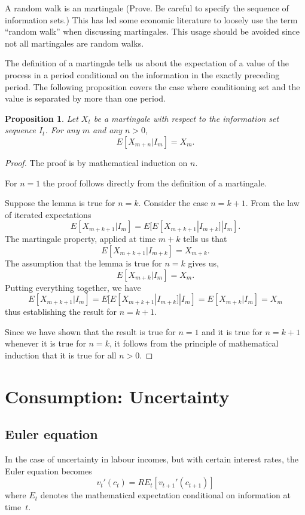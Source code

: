 \documentclass[12pt,reqno,openany]{amsbook}
\theoremstyle{plain}
\newtheorem{prop}{Proposition}[chapter]
\theoremstyle{definition}
\begin{document}
A random walk is an martingale (Prove. Be careful to specify the
sequence of information sets.) This has led some economic literature
to loosely use the term ``random walk'' when discussing martingales.
This usage should be avoided since not all martingales are random walks.

The definition of a martingale tells us about the expectation of a
value of the process in a period conditional on the information in the
exactly preceding period. The following proposition covers the case where
conditioning set and the value is separated by more than one period.

\begin{prop}\label{prop:martingale-mp}
Let $X_t$ be a martingale with respect to the information set sequence
$I_t$. For any $m$ and any $n>0$,
\[E[X_{m+n}|I_m]=X_m.\]
\end{prop}
\begin{proof}
The proof is by mathematical induction on $n$.

For $n=1$ the proof follows directly from the definition of a martingale.

Suppose the lemma is true for $n=k$. Consider the case $n=k+1$.
From the law of
iterated expectations
\[E[X_{m+k+1}|I_m]=E[E[X_{m+k+1}|I_{m+k}]|I_m].\]
The martingale property, applied at time $m+k$ tells us that
\[E[X_{m+k+1}|I_{m+k}]=X_{m+k}.\] 
The assumption that the lemma is true for $n=k$ gives us,
\[E[X_{m+k}|I_m]=X_m.\]
Putting everything together, we have
\[E[X_{m+k+1}|I_m]=E[E[X_{m+k+1}|I_{m+k}]|I_m]=E[X_{m+k}|I_m]=X_m\]
thus establishing the result for $n=k+1$.

Since we have shown that the result is true for $n=1$ and it is true
for $n=k+1$ whenever it is true for $n=k$, it follows from the
principle of mathematical induction that it is true for all $n>0$.
\end{proof}






\chapter{Consumption: Uncertainty}
\section{Euler equation}
In the case of uncertainty in labour incomes, but with certain
interest rates, the Euler equation becomes
\begin{equation}\label{eq:euler-uncertain}
v_t'(c_t)=RE_t[v_{t+1}'(c_{t+1})]
\end{equation}
where $E_t$ denotes the mathematical expectation conditional on information at time~$t$.
\end{document}
